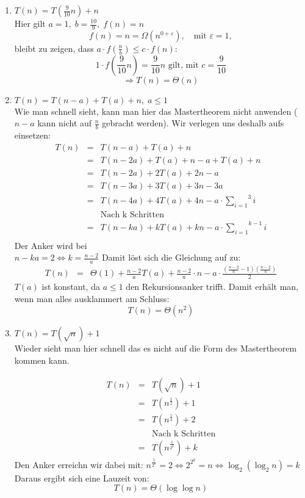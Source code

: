 \documentclass[11pt,a4paper,ngerman]{article}
\begin{document}
\begin{enumerate}[\bfseries (a)]

\item $T(n) = T(\frac{9}{10} n) + n$\\
Hier gilt $a = 1, \; b = \frac{10}{9}, \; f(n) = n$
$$
f(n) = n = \Omega (n^{0 + \varepsilon}), \quad \text{mit } \varepsilon = 1,
$$
bleibt zu zeigen, dass $a \cdot f(\frac{n}{b}) \leq c \cdot f(n)$:
$$
1 \cdot f(\frac{9}{10} n) = \frac{9}{10}n \text{ gilt, mit } c = \frac{9}{10}
$$
$$
\Rightarrow T(n) = \Theta (n)
$$

\item $T(n) = T(n-a) + T(a) + n, \; a\leq 1$\\
Wie man schnell sieht, kann man hier das Mastertheorem nicht anwenden ($n-a$ kann nicht auf $\frac{n}{b}$ gebracht werden). Wir verlegen uns deshalb aufs einsetzen:
$$
\begin{array}{rcl}
T(n) &=& T(n - a) + T(a) + n\\
&=& T(n - 2a) + T(a) + n - a + T(a) + n\\
&=& T(n - 2a) + 2T(a) + 2n - a\\
&=& T(n - 3a) +3 T(a) +3n - 3a\\
&=& T(n - 4a) +4T(a) + 4n - a \cdot \overset{3}{\underset{i=1}{\sum}} i\\
&& \text{Nach k Schritten}\\
&=& T(n - ka) + kT(a) + kn - a \cdot \overset{k-1}{\underset{i=1}{\sum}} i\\
\end{array}
$$
Der Anker wird bei\\
$n - ka = 2 \Leftrightarrow k = \frac{n-2}{a}$
Damit löst sich die Gleichung auf zu:
$$
\begin{array}{rcl}
T(n) &=& \Theta(1) + \frac{n-2}{a} T(a) + \frac{n-2}{a} \cdot n - a \cdot \frac{(\frac{n-2}{a} - 1)(\frac{n-2}{a})}{2}
\end{array}
$$
$T(a)$ ist konstant, da $a\leq1$ den Rekursionsanker trifft. Damit erhält man, wenn man alles ausklammert am Schluss:
$$
T(n) = \Theta(n^2)
$$

\item $T(n) = T(\sqrt{n}) + 1$\\
Wieder sieht man hier schnell das es nicht auf die Form des Mastertheorem kommen kann.

$$
\begin{array}{rcl}
T(n) &=& T(\sqrt{n}) + 1\\
&=& T(n^{\frac{1}{2}}) + 1\\
&=& T(n^{\frac{1}{4}}) + 2\\
&& \text{Nach k Schritten}\\
&=& T(n^{\frac{1}{2^k}}) + k
\end{array}
$$
Den Anker erreichn wir dabei mit:
$n^{\frac{1}{2^k}} = 2 \Leftrightarrow 2^{2^k} = n \Leftrightarrow \log_2 (\log _2 n) = k$\\
Daraus ergibt sich eine Lauzeit von:
$$T(n) = \Theta (\log \log n)$$



\end{enumerate}
\end{document}
